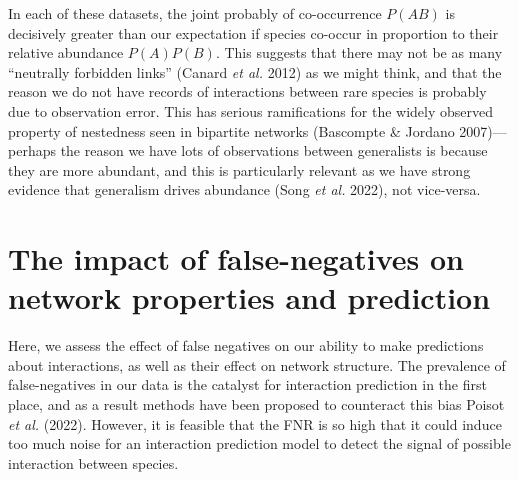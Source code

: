 \documentclass[10pt,oneside]{article}
\begin{document}
In each of these datasets, the joint probably of co-occurrence \(P(AB)\)
is decisively greater than our expectation if species co-occur in
proportion to their relative abundance \(P(A)P(B)\). This suggests that
there may not be as many ``neutrally forbidden links'' (Canard \emph{et
al.} 2012) as we might think, and that the reason we do not have records
of interactions between rare species is probably due to observation
error. This has serious ramifications for the widely observed property
of nestedness seen in bipartite networks (Bascompte \& Jordano
2007)---perhaps the reason we have lots of observations between
generalists is because they are more abundant, and this is particularly
relevant as we have strong evidence that generalism drives abundance
(Song \emph{et al.} 2022), not vice-versa.

\hypertarget{the-impact-of-false-negatives-on-network-properties-and-prediction}{%
\section{The impact of false-negatives on network properties and
prediction}\label{the-impact-of-false-negatives-on-network-properties-and-prediction}}

Here, we assess the effect of false negatives on our ability to make
predictions about interactions, as well as their effect on network
structure. The prevalence of false-negatives in our data is the catalyst
for interaction prediction in the first place, and as a result methods
have been proposed to counteract this bias Poisot \emph{et al.} (2022).
However, it is feasible that the FNR is so high that it could induce too
much noise for an interaction prediction model to detect the signal of
possible interaction between species.
\end{document}
